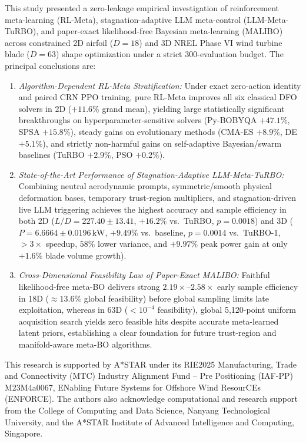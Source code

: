 \documentclass[11pt,fleqn,letterpaper]{article}
\begin{document}
This study presented a zero-leakage empirical investigation of reinforcement meta-learning (RL-Meta), stagnation-adaptive LLM meta-control (LLM-Meta-TuRBO), and paper-exact likelihood-free Bayesian meta-learning (MALIBO) across constrained 2D airfoil ($D=18$) and 3D NREL Phase VI wind turbine blade ($D=63$) shape optimization under a strict 300-evaluation budget. The principal conclusions are:
\begin{enumerate}
\setlength{\itemsep}{1.5pt}\setlength{\parskip}{0pt}\setlength{\topsep}{2pt}
\item \emph{Algorithm-Dependent RL-Meta Stratification:} Under exact zero-action identity and paired CRN PPO training, pure RL-Meta improves all six classical DFO solvers in 2D ($+11.6\%$ grand mean), yielding large statistically significant breakthroughs on hyperparameter-sensitive solvers (Py-BOBYQA $+47.1\%$, SPSA $+15.8\%$), steady gains on evolutionary methods (CMA-ES $+8.9\%$, DE $+5.1\%$), and strictly non-harmful gains on self-adaptive Bayesian/swarm baselines (TuRBO $+2.9\%$, PSO $+0.2\%$).
\item \emph{State-of-the-Art Performance of Stagnation-Adaptive LLM-Meta-TuRBO:} Combining neutral aerodynamic prompts, symmetric/smooth physical deformation bases, temporary trust-region multipliers, and stagnation-driven live LLM triggering achieves the highest accuracy and sample efficiency in both 2D ($L/D = 227.40 \pm 13.41$, $+16.2\%$ vs.\ TuRBO, $p=0.0018$) and 3D ($P = 6.6664 \pm 0.0196\,\text{kW}$, $+9.49\%$ vs.\ baseline, $p=0.0014$ vs.\ TuRBO-1, $>3\times$ speedup, $58\%$ lower variance, and $+9.97\%$ peak power gain at only $+1.6\%$ blade volume growth).
\item \emph{Cross-Dimensional Feasibility Law of Paper-Exact MALIBO:} Faithful likelihood-free meta-BO delivers strong $2.19\times$--$2.58\times$ early sample efficiency in 18D ($\approx 13.6\%$ global feasibility) before global sampling limits late exploitation, whereas in 63D ($<10^{-4}$ feasibility), global 5,120-point uniform acquisition search yields zero feasible hits despite accurate meta-learned latent priors, establishing a clear foundation for future trust-region and manifold-aware meta-BO algorithms.
\end{enumerate}

This research is supported by A*STAR under its RIE2025 Manufacturing, Trade and Connectivity (MTC) Industry Alignment Fund -- Pre Positioning (IAF-PP) M23M4a0067, ENabling Future Systems for Offshore Wind ResourCEs (ENFORCE). The authors also acknowledge computational and research support from the College of Computing and Data Science, Nanyang Technological University, and the A*STAR Institute of Advanced Intelligence and Computing, Singapore.
\end{document}
